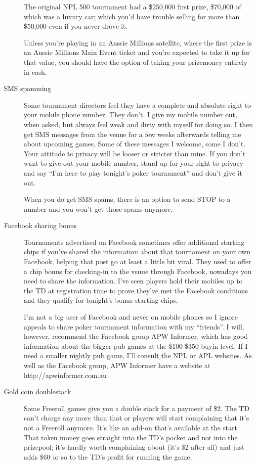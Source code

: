\begin{description}
The original NPL 500 tournament had a \$250,000 first prize, \$70,000 of
which was a luxury car; which you'd have trouble selling for more
than \$50,000 even if you never drove it.

Unless you're playing in an Aussie Millions satellite, where the first prize
is an Aussie Millions Main Event ticket and you're expected to take it
up for that value, you should have the option of taking your prizemoney
entirely in cash.

\item[SMS spamming] Some tournament directors feel they have a
complete and absolute right to your mobile phone number. They don't.
I give my mobile number out, when asked, but always feel weak and
dirty with myself for doing so. I then get SMS messages from the venue
for a few weeks afterwards telling me about upcoming games. Some of
these messages I welcome, some I don't. Your attitude to privacy will
be looser or stricter than mine. If you don't want to give out your
mobile number, stand up for your right to privacy and say ``I'm here
to play tonight's poker tournament'' and don't give it out.

When you do get SMS spams, there is an option to send STOP to a number
and you won't get those spams anymore.

\item[Facebook sharing bonus] Tournaments advertised on Facebook sometimes
offer additional starting chips if you've shared the information
about that tournament on your own Facebook, helping that post go at
least a little bit viral. They used to offer a chip bonus for
checking-in to the venue through Facebook, nowadays you need to share
the information. I've seen players hold their mobiles up to the TD at
registration time to prove they've met the Facebook conditions and
they qualify for tonight's bonus starting chips.

I'm not a big user of Facebook and never on mobile phones so I ignore
appeals to share poker tournament information with my ``friends''. I
will, however, recommend the Facebook group APW Informer, which has
good information about the bigger pub games at the \$100-\$350 buyin
level. If I need a smaller nightly pub game, I'll consult the NPL or
APL websites. As well as the Facebook group, APW Informer have a
website at http://apwinformer.com.au

\item[Gold coin doublestack] Some Freeroll games give you a double stack
for a payment of \$2. The TD can't charge any more than that or
players will start complaining that it's not a Freeroll anymore.
It's like an add-on that's available at the start. That token
money goes straight into the TD's pocket and not into the prizepool;
it's hardly worth complaining about (it's \$2 after all) and just adds
\$60 or so to the TD's profit for running the game.

\end{description}


